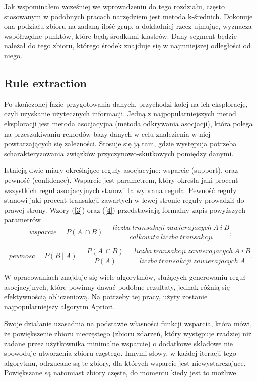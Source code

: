 \documentclass[polish, twoside, 12pt, a4paper]{article}
\theoremstyle{definition}
\theoremstyle{plain}
\theoremstyle{remark}
\begin{document}
Jak wspominałem wcześniej we wprowadzeniu do tego rozdziału, często stosowanym w podobnych pracach narzędziem jest metoda k-średnich. Dokonuje ona podziału zbioru na zadaną ilość grup, a dokładniej rzecz ujmując, 
wyznacza współrzędne punktów, które będą środkami klastrów. Dany segment będzie należał do tego zbioru, którego środek znajduje się w najmniejszej odległości od niego.


\subsection{Rule extraction}

Po skończonej fazie przygotowania danych, przychodzi kolej na ich eksplorację, czyli uzyskanie użytecznych informacji. Jedną z najpopularniejszych metod eksploracji jest metoda asocjacyjna (metoda odkrywania asocjacji), 
która polega na przeszukiwaniu rekordów bazy danych w celu znalezienia w niej powtarzających się zależności. Stosuje się ją tam, gdzie występuja potrzeba scharakteryzowania związków przyczynowo-skutkowych pomiędzy danymi. 
 
Istnieją dwie miary określające reguły asocjacyjne: wsparcie (support), oraz pewność (confidence). 
Wsparcie jest parametrem, który określa jaki procent wszystkich reguł asocjacyjnych stanowi ta wybrana reguła.
Pewność reguły stanowi jaki procent transakcji zawartych w lewej stronie reguły prowadził do prawej strony. Wzory (\ref{3}) oraz (\ref{4}) przedstawiają 
formalny zapis powyższych parametrów
\begin{equation}\label{3}
wsparcie=P(A\ \cap B)=\frac{liczba\ transakcji\ zawierajacych\ A\ i\ B}{calkowita\ liczba\ transakcji},
\end{equation}

\begin{equation}\label{4}
pewnosc=P(B\ |\ A)=\frac{P(A\ \cap B)}{P(A)}=\frac{liczba\ transakcji\ zawierajacych\ A\ i\ B}{liczba\ transakcji\ zawierajacych\ A}.
\end{equation}

W opracowaniach znajduje się wiele algorytmów, służących generowaniu reguł asocjacyjnych, które powinny dawać podobne rezultaty, jednak 
różnią się efektywnością obliczeniową. Na potrzeby tej pracy, użyty zostanie najpopularniejszy algorytm Apriori.

Swoje działanie uzasadnia na podstawie własności funkcji wsparcia, która mówi, że powiększenie zbioru nieczęstego (zbioru zdarzeń, który występuje rzadziej niż 
zadane przez użytkownika minimalne wsparcie) o dodatkowe składowe nie spowoduje utworzenia zbioru częstego. Innymi słowy, w każdej iteracji tego algorytmu, odrzucane są 
te zbiory, dla których wsparcie jest niewystarczające. Powiększane są natomiast zbiory częste, do momentu kiedy jest to możliwe.
\end{document}
